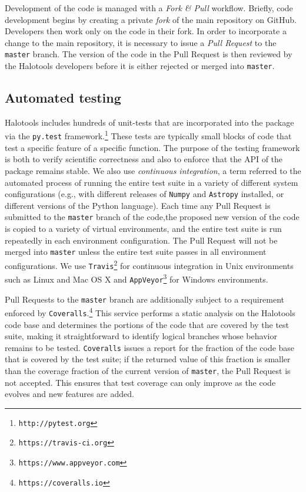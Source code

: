 \documentclass[twocolumn, tighten]{aastex6}
\begin{document}
Development of the code is managed with a {\em Fork \& Pull} workflow. Briefly, code development begins by creating a private {\em fork} of the main repository on GitHub. Developers then work only on the code in their fork. In order to incorporate a change to the main repository, it is necessary to issue a {\em Pull Request} to the {\tt master} branch. The version of the code in the Pull Request is then reviewed by the Halotools developers before it is either rejected or merged into {\tt master}.

\subsection{Automated testing}
\label{subsection:testing}

Halotools includes hundreds of unit-tests that are incorporated into the package via the {\tt py.test} framework.\footnote{\tt http://pytest.org} These tests are typically small blocks of code that test a specific feature of a specific function. The purpose of the testing framework is both to verify scientific correctness and also to enforce that the API of the package remains stable. We also use {\em continuous integration}, a term referred to the automated process of running the entire test suite in a variety of different system configurations (e.g., with different releases of {\tt Numpy} and {\tt Astropy} installed, or different versions of the Python language). Each time any Pull Request is submitted to the {\tt master} branch of the code,the proposed new version of the code is copied to a variety of virtual environments, and the entire test suite is run repeatedly in each environment configuration. The Pull Request will not be merged into {\tt master} unless the entire test suite passes in all environment configurations. We use {\tt Travis}\footnote{\tt https://travis-ci.org} for continuous integration in Unix environments such as Linux and Mac OS X and {\tt AppVeyor}\footnote{\tt https://www.appveyor.com} for Windows environments. 

Pull Requests to the {\tt master} branch are additionally subject to a requirement enforced by {\tt Coveralls}.\footnote{\tt https://coveralls.io} This service performs a static analysis on the Halotools code base and determines the portions of the code that are covered by the test suite, making it straightforward to identify logical branches whose behavior remains to be tested. {\tt Coveralls} issues a report for the fraction of the code base that is covered by the test suite; if the returned value of this fraction is smaller than the coverage fraction of the current version of {\tt master}, the Pull Request is not accepted. This ensures that test coverage can only improve as the code evolves and new features are added. 
\end{document}
